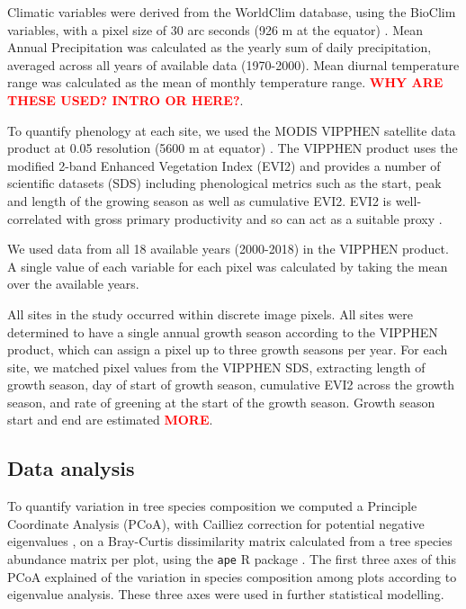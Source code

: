 \documentclass[11pt,a4paper]{article}
\newcommand{\textapprox}{\raisebox{0.5ex}{\texttildelow}}  %
\newcommand{\todo}[1]{\textcolor{red}{\textbf{#1}}}   %
\begin{document}
Climatic variables were derived from the WorldClim database, using the BioClim variables, with a pixel size of 30 arc seconds (926 m at the equator) \citep{Fick2017}. Mean Annual Precipitation was calculated as the yearly sum of daily precipitation, averaged across all years of available data (1970-2000). Mean diurnal temperature range was calculated as the mean of monthly temperature range. \todo{WHY ARE THESE USED? INTRO OR HERE?}.

To quantify phenology at each site, we used the MODIS VIPPHEN satellite data product at 0.05\textdegree{} resolution (\textapprox5600 m at equator) \citep{}. The VIPPHEN product uses the modified 2-band Enhanced Vegetation Index (EVI2) and provides a number of scientific datasets (SDS) including phenological metrics such as the start, peak and length of the growing season as well as cumulative EVI2. EVI2 is well-correlated with gross primary productivity and so can act as a suitable proxy \citep{}.

We used data from all 18 available years (2000-2018) in the VIPPHEN product. A single value of each variable for each pixel was calculated by taking the mean over the available years.

All sites in the study occurred within discrete image pixels. All sites were determined to have a single annual growth season according to the VIPPHEN product, which can assign a pixel up to three growth seasons per year. For each site, we matched pixel values from the VIPPHEN SDS, extracting length of growth season, day of start of growth season, cumulative EVI2 across the growth season, and rate of greening at the start of the growth season. Growth season start and end are estimated \todo{MORE}.

\subsection{Data analysis}

To quantify variation in tree species composition we computed a Principle Coordinate Analysis (PCoA), with Cailliez correction for potential negative eigenvalues \citep{Legendre1998}, on a Bray-Curtis dissimilarity matrix calculated from a tree species abundance matrix per plot, using the \texttt{ape} R package \citep{ape2019}. The first three axes of this PCoA explained \pcoaPer{} of the variation in species composition among plots according to eigenvalue analysis. These three axes were used in further statistical modelling.
\end{document}
